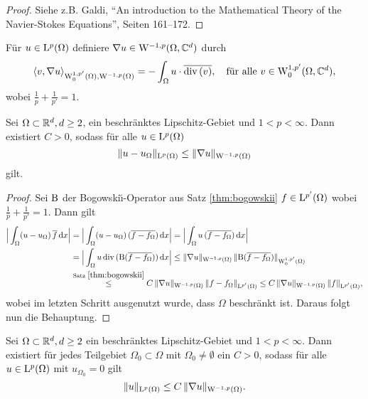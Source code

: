 \begin{proof}
  Siehe z.B. Galdi, ``An introduction to the Mathematical Theory of the Navier-Stokes Equations'', Seiten 161--172.
\end{proof}

Für $u \in \mathrm{L}^p(\Omega)$ definiere $\nabla u \in \mathrm{W}^{-1,p}(\Omega, \mathbb{C}^d)$ durch
$$
\langle v, \nabla u\rangle_{\mathrm{W}_0^{1,p'}(\Omega), \mathrm{W}^{-1,p}(\Omega)}
= -\int_\Omega u \cdot \overline{\mathrm{div\,} (v)}, \quad\text{für alle } v \in \mathrm{W}^{1,p'}_0(\Omega, \mathbb{C}^d),
$$
wobei $\frac{1}{p} + \frac{1}{p'} = 1$.

\begin{lem}
  \label{lem:poincare}
  Sei $\Omega \subset \mathbb{R}^d, d \geq 2$, ein beschränktes Lipschitz-Gebiet und $1 < p< \infty$.
  Dann existiert $C > 0$, sodass für alle $u \in \mathrm{L}^p(\Omega)$
  $$
  \| u - u_\Omega\|_{\mathrm{L}^p(\Omega)} \leq \| \nabla u\|_{\mathrm{W}^{-1,p}(\Omega)}
  $$
  gilt.
\end{lem}

\begin{proof}
  Sei $\mathrm{B}$ der Bogowski\u{\i}-Operator aus Satz \ref{thm:bogowskii} $f \in \mathrm{L}^{p'}(\Omega)$ wobei $\frac{1}{p} + \frac{1}{p'} = 1$.
  Dann gilt
  \begin{align*}
  \Big| \int_\Omega (u - u_\Omega) \, \overline f \, {\operatorname{d}\!{x}} \Big|
    &= \Big| \int_\Omega (u - u_\Omega) \, (\overline{f - f_\Omega})  \, {\operatorname{d}\!{x}} \Big|
    = \Big| \int_\Omega u \, (\overline{f - f_\Omega}) \, {\operatorname{d}\!{x}} \Big| \\
    &= \Big| \int_\Omega u \, \mathrm{div\,} ( \mathrm{B}(\overline{f - f_\Omega}) ) \, {\operatorname{d}\!{x}} \Big|
    \leq \|\nabla u\|_{\mathrm{W}^{-1,p}(\Omega)} \, \|\mathrm{B}(\overline{f - f_\Omega}) \|_{\mathrm{W}_0^{1,p'}(\Omega)} \\
    &\overset{\text{Satz } \ref{thm:bogowskii}}{\leq}  C \,  \|\nabla u\|_{\mathrm{W}^{-1,p}(\Omega)} \, \|f - f_\Omega\|_{\mathrm{L}^{p'}(\Omega)}
    \leq C \, \|\nabla u\|_{\mathrm{W}^{-1,p}(\Omega)} \, \|f\|_{\mathrm{L}^{p'}(\Omega)},
  \end{align*}
  wobei im letzten Schritt ausgenutzt wurde, dass $\Omega$ beschränkt ist.
  Daraus folgt nun die Behauptung.
\end{proof}

\begin{lem}
  \label{lem:poincare2}
  Sei $\Omega \subset \mathbb{R}^d, d\geq 2$ ein beschränktes Lipschitz-Gebiet und $1 < p < \infty$.
  Dann existiert für jedes Teilgebiet $\Omega_0 \subset \Omega$ mit $\Omega_0 \neq \emptyset$ ein $C > 0$, sodass für alle $u \in \mathrm{L}^p(\Omega)$ mit $u_{\Omega_0} = 0$ gilt
  $$
  \|u \|_{\mathrm{L}^p(\Omega)} \leq C \, \| \nabla u \|_{\mathrm{W}^{-1,p}(\Omega)}.
  $$
\end{lem}

